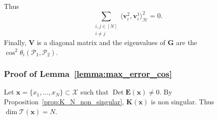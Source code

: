 \documentclass[twoside,11pt]{book}
\numberwithin{theorem}{chapter}
\numberwithin{definition}{chapter}
\numberwithin{proposition}{chapter}
\numberwithin{corollary}{chapter}
\numberwithin{example}{chapter}
\numberwithin{lemma}{chapter}
\numberwithin{assumption}{chapter}
\numberwithin{equation}{chapter}
\numberwithin{figure}{chapter}
\DeclareMathOperator{\Det}{Det}
\begin{document}
Thus
\begin{equation}
\sum\limits_{\substack{i,j \in [N]\\ i \neq j}} \langle \bm{v}_{i}^{2}, \bm{v}_{i}^{1}\rangle_{\mathcal{H}}^{2} = 0 .
\end{equation}
Finally, $\bm{V}$ is a diagonal matrix and the eigenvalues of $\bm{G}$ are the $\cos^{2} \theta_{i}(\mathcal{P}_{1},\mathcal{P}_{2})$.
\subsubsection{Proof of Lemma~\ref{lemma:max_error_cos}}

Let $\bm{x} = \{x_{1}, \dots , x_{N}\} \subset \mathcal{X}$ such that $\Det \bm{E}(\bm{x}) \neq 0$. By Proposition~\ref{prop:K_N_non_singular}, $\bm{K}(\bm{x})$ is non singular. Thus $\dim \mathcal{T}(\bm{x}) = N$. 
\end{document}
